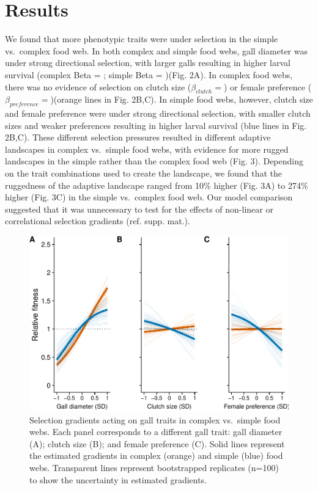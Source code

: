 \documentclass[]{elsarticle} %
\makeatletter
\def\maxwidth{\ifdim\Gin@nat@width>\linewidth\linewidth
\else\Gin@nat@width\fi}
\let\Oldincludegraphics\includegraphics
\renewcommand{\includegraphics}[1]{\Oldincludegraphics[width=\maxwidth]{#1}}
\makeatother
\begin{document}
\section{Results}\label{results}

We found that more phenotypic traits were under selection in the simple
vs.~complex food web. In both complex and simple food webs, gall
diameter was under strong directional selection, with larger galls
resulting in higher larval survival (complex Beta = ; simple Beta =
)(Fig. 2A). In complex food webs, there was no evidence of selection on
clutch size (\(\beta_{clutch}=\)) or female preference
(\(\beta_{preference}=\))(orange lines in Fig. 2B,C). In simple food
webs, however, clutch size and female preference were under strong
directional selection, with smaller clutch sizes and weaker preferences
resulting in higher larval survival (blue lines in Fig. 2B,C). These
different selection pressures resulted in different adaptive landscapes
in complex vs.~simple food webs, with evidence for more rugged
landscapes in the simple rather than the complex food web (Fig. 3).
Depending on the trait combinations used to create the landscape, we
found that the ruggedness of the adaptive landscape ranged from 10\%
higher (Fig. 3A) to 274\% higher (Fig. 3C) in the simple vs.~complex
food web. Our model comparison suggested that it was unnecessary to test
for the effects of non-linear or correlational selection gradients (ref.
supp. mat.).

\begin{figure}[htbp]
\centering
\includegraphics{elsevier_test_files/figure-latex/Figure 2 Univariate Landscapes-1.pdf}
\caption{Selection gradients acting on gall traits in complex vs.~simple
food webs. Each panel corresponds to a different gall trait: gall
diameter (A); clutch size (B); and female preference (C). Solid lines
represent the estimated gradients in complex (orange) and simple (blue)
food webs. Transparent lines represent bootstrapped replicates (n=100)
to show the uncertainty in estimated gradients.}
\end{figure}
\end{document}
